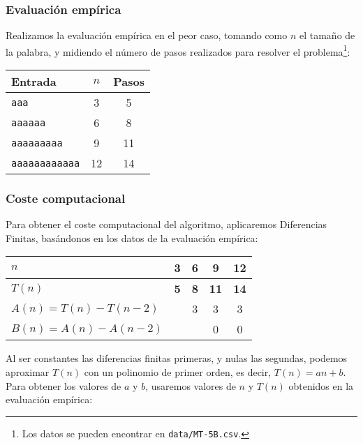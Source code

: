 \subsubsection*{Evaluación empírica}
Realizamos la evaluación empírica en el peor caso, tomando como $n$ el tamaño de la palabra, y midiendo el número de pasos realizados para resolver el problema\footnote{Los datos se pueden encontrar en \texttt{data/MT-5B.csv}.}:

\begin{table}[h]
    \centering
    \begin{tabular}{lcc}
        Entrada & $n$ & Pasos \\
        \hline
        \texttt{aaa}                &  3  & 5 \\
        \texttt{aaaaaa}             &  6  & 8 \\
        \texttt{aaaaaaaaa}          &  9  & 11 \\
        \texttt{aaaaaaaaaaaa}       & 12  & 14 \\
    \end{tabular}
\end{table}

\subsubsection*{Coste computacional}
Para obtener el coste computacional del algoritmo, aplicaremos Diferencias Finitas, basándonos en los datos de la evaluación empírica:

\begin{table}[H]
    \centering
    \begin{tabular}{|l|c|c|c|c|}
        \hline
        $n$    & \textbf{3} & \textbf{6} & \textbf{9}  & \textbf{12} \\ \hline
        $T(n)$ & \textbf{5} & \textbf{8} & \textbf{11} & \textbf{14} \\ \hline
        \hline
        $A(n) = T(n) - T(n-2)$ &   & 3 & 3 & 3 \\ \hline
        $B(n) = A(n) - A(n-2)$ &   &   & 0 & 0 \\ \hline
    \end{tabular}
    \label{tab:5B}
\end{table}

Al ser constantes las diferencias finitas primeras, y nulas las segundas, podemos aproximar $T(n)$ con un polinomio de primer orden, es decir, $T(n) = an + b$.\\

Para obtener los valores de $a$ y $b$, usaremos valores de $n$ y $T(n)$ obtenidos en la evaluación empírica:

